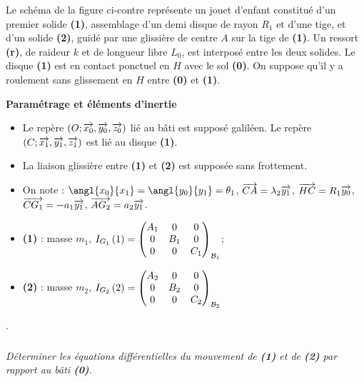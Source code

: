 \documentclass[10pt,fleqn]{article} %
\begin{document}
\def\pathfig{images}

\vspace{5cm}
\pagestyle{fancy}
\thispagestyle{plain}

\def\columnseprulecolor{\color{ocre}}
\setlength{\columnseprule}{0.4pt} 

\def\pathfig{images}

\ifprof
\else
\begin{multicols}{2}
\fi


Le schéma de la figure ci-contre représente un jouet d’enfant constitué d’un premier solide \textbf{(1)}, assemblage d’un demi disque de rayon $R_1$ et d’une tige, et d’un solide \textbf{(2)}, guidé par une glissière de centre $A$ sur la tige de \textbf{(1)}.
Un ressort \textbf{(r)}, de raideur $k$ et de longueur libre $L_0$, est interposé entre les deux solides.
Le disque \textbf{(1)} est en contact ponctuel en $H$ avec le sol \textbf{(0)}. On suppose qu’il y a roulement sans glissement en $H$ entre \textbf{(0)} et \textbf{(1)}.

\textbf{Paramétrage et éléments d'inertie}
\begin{itemize}
\item Le repère $\repere{O}{x_0}{y_0}{z_0}$ lié au bâti est supposé galiléen. Le repère $\repere{C}{x_1}{y_1}{z_1}$ est lié au disque \textbf{(1)}.
\item La liaison glissière entre \textbf{(1)} et \textbf{(2)} est supposée sans frottement.
\item On note : $\angl{x_0}{x_1}=\angl{y_0}{y_1}=\theta_1$, 
$\vect{CA}=\lambda_2\vect{y_1}$, 
$\vect{HC}=R_1\vect{y_0}$,  
$\vect{CG_1}=-a_1\vect{y_1}$,
$\vect{AG_2}=a_2\vect{y_1}$.
\item \textbf{(1)} : masse $m_1$, $\inertie{G_1}{1}=\matinertie{A_1}{B_1}{C_1}{0}{0}{0}{\mathcal{B}_1}$;
\item \textbf{(2)} : masse $m_2$, $\inertie{G_2}{2}=\matinertie{A_2}{B_2}{C_2}{0}{0}{0}{\mathcal{B}_2}$
\end{itemize}.

\subparagraph*{}\textit{Déterminer les équations différentielles du mouvement de \textbf{(1)} et de \textbf{(2)} par rapport au bâti \textbf{(0)}.}



\end{multicols}
\end{document}
